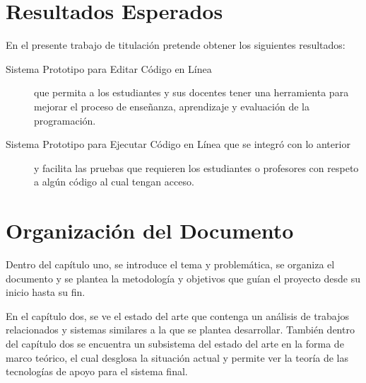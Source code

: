 \section{Resultados Esperados}
En el presente trabajo de titulación pretende obtener los siguientes resultados:
\begin{description}
	\item[Sistema Prototipo para Editar Código en Línea] que permita a los estudiantes y sus docentes tener una herramienta para mejorar el proceso de enseñanza, aprendizaje y evaluación de la programación.   
 \item[Sistema Prototipo para Ejecutar Código en Línea que se integró con lo anterior] y facilita las pruebas que requieren los estudiantes o profesores con respeto a algún código al cual tengan acceso. 
\end{description}

\section{Organización del Documento}
Dentro del capítulo uno, se introduce el tema y problemática, se organiza el documento y se plantea la metodología y objetivos que guían el proyecto desde su inicio hasta su fin.

En el capítulo dos, se ve el estado del arte que contenga un análisis de trabajos relacionados y sistemas similares a la que se plantea desarrollar. También dentro del capítulo dos se encuentra un subsistema del estado del arte en la forma de marco teórico, el cual desglosa la situación actual y permite ver la teoría de las tecnologías de apoyo para el sistema final.

